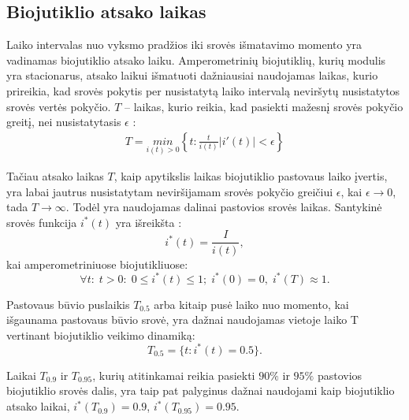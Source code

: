 \documentclass[12pt, a4paper, lithuanian]{article}
\begin{document}
\subsection{Biojutiklio atsako laikas}

Laiko intervalas nuo vyksmo pradžios iki srovės išmatavimo momento yra
vadinamas biojutiklio atsako laiku. Amperometrinių biojutiklių, kurių modulis
yra stacionarus, atsako laikui išmatuoti dažniausiai naudojamas laikas, kurio
prireikia, kad srovės pokytis per nusistatytą laiko intervalą neviršytų
nusistatytos srovės vertės pokyčio. $T$ – laikas, kurio reikia, kad pasiekti
mažesnį srovės pokyčio greitį, nei nusistatytasis $\epsilon$ \cite{baronas2009mathematical}:
\begin{equation} 
\begin{aligned}
    T = \underset{i(t)>0}{min}\left\{t:\frac{t}{i(t)} \left| i'(t)
    \right| < \epsilon \right\}
\end{aligned}
\end{equation}

Tačiau atsako laikas $T$, kaip apytikslis laikas biojutiklio pastovaus laiko
įvertis, yra labai jautrus nusistatytam neviršijamam srovės pokyčio greičiui
$\epsilon$, kai $\epsilon \to 0$, tada $T \to \infty$. Todėl yra naudojamas
dalinai pastovios srovės laikas. Santykinė srovės
funkcija $i^*(t)$ yra išreikšta \cite{baronas2009mathematical}:
\begin{equation}
    i^*(t) = \frac{I}{i(t)},
\end{equation}
kai amperometriniuose biojutikliuose:
\begin{equation}
    \forall t: \; t > 0 :\; 0 \leq i^*(t)\leq 1;\; i^*(0) = 0,\; i^*(T)\approx
    1.
\end{equation}

Pastovaus būvio puslaikis $T_{0.5}$ arba kitaip pusė laiko nuo momento, kai
išgaunama pastovaus būvio srovė, yra dažnai naudojamas vietoje laiko T
vertinant biojutiklio veikimo dinamiką:
\begin{equation}
    T_{0.5}=\{t:i^*(t)=0.5\}.
\end{equation}

Laikai $T_{0.9}$ ir $T_{0.95}$, kurių atitinkamai reikia pasiekti $90\%$ ir $95\%$
pastovios biojutiklio srovės dalis, yra taip pat palyginus dažnai naudojami
kaip biojutiklio atsako laikai, $i^*(T_{0.9}) = 0.9$, $i^*(T_{0.95}) = 0.95$. 
\end{document}
